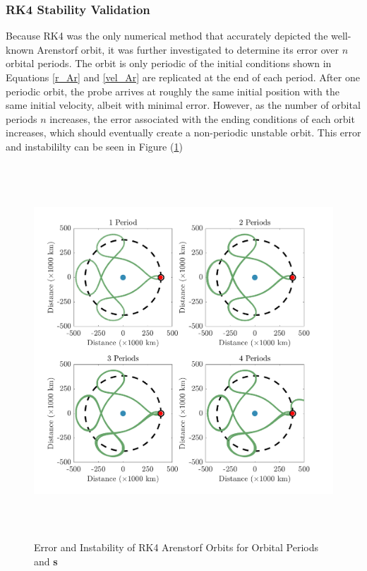 \documentclass[conf]{new-aiaa}
\begin{document}
    \subsubsection{RK4 Stability Validation}
    Because RK4 was the only numerical method that accurately depicted the well-known Arenstorf orbit, it was further investigated to determine its error over $n$ orbital periods. The orbit is only periodic of the initial conditions shown in Equations \eqref{r_Ar} and \eqref{vel_Ar} are replicated at the end of each period. After one periodic orbit, the probe arrives at roughly the same initial position with the same initial velocity, albeit with minimal error. However, as the number of orbital periods $n$ increases, the error associated with the ending conditions of each orbit increases, which should eventually create a non-periodic unstable orbit. This error and instabililty can be seen in Figure (\ref{RK4_Period})
        \begin{figure}[H]
            \centering
            \includegraphics[height = 14cm]{Figures/Arenstorf/Aren_Stability.png}
            \caption{Error and Instability of RK4 Arenstorf Orbits for  Orbital Periods and  \textbf{ s}}
            \label{RK4_Period}
        \end{figure}
\end{document}
